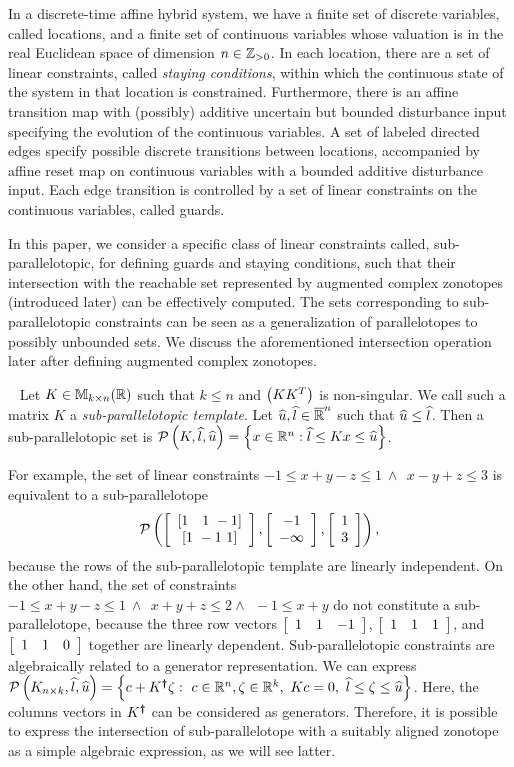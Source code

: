 
In a discrete-time affine hybrid system, we have a finite set of
discrete variables, called locations, and a finite set of continuous
variables whose valuation is in the real Euclidean space of dimension
$n\in\mathbb{Z}_{> 0}$.  In each location, there are a set of linear constraints,
called \emph{staying conditions}, within which the continuous state of
the system in that location is constrained.  Furthermore, there is an
affine transition map with (possibly) additive uncertain but bounded
disturbance input specifying the evolution of the continuous
variables. A set of labeled directed edges specify possible discrete
transitions between locations, accompanied by affine reset map on
continuous variables with a bounded additive disturbance input. Each
edge transition is controlled by a set of linear constraints on the
continuous variables, called guards.

In this paper, we consider a specific class of linear constraints
called, sub-parallelotopic, for defining guards and staying
conditions, such that their intersection with the reachable set
represented by augmented complex zonotopes (introduced later) can be
effectively computed. The sets corresponding to sub-parallelotopic
constraints can be seen as a generalization of parallelotopes to
possibly unbounded sets.  We discuss the aforementioned intersection
operation later after defining augmented complex zonotopes.
%
\begin{definition}~\label{defn:sub-parallelotope} Let
  $K\in\mathbb{M}_{k\times n}(\mathbb{R})$ such that $k\leq n$ and $\left(KK^T\right)$ is
  non-singular.  We call such a matrix $K$ a
  \emph{sub-parallelotopic template}.  Let
  $\widehat{u},\widehat{l}\in\mathbb{\overline{R}}^n$ such that $\widehat{u}\leq\widehat{l}$.  Then
  a sub-parallelotopic set is $\mathcal{P}\left(K,\widehat{l},\widehat{u}\right) = \left\{x\in\mathbb{R}^n: \widehat{l}\leq Kx \leq \widehat{u}\right\}$.
\end{definition}
%
For example, the set of linear constraints $-1\leq x+y-z\leq
1~\wedge~~ x-y+z\leq 3$ is equivalent to a sub-parallelotope
$$\mathcal{P}\left(\left[\begin{array}{c}{\left[1~~~1~-1\right]}\\{\left[1~-1~1\right]} \end{array}\right],\left[\begin{array}{c}{-1}\\{-\infty} \end{array}\right],\left[\begin{array}{c}{1}\\{3} \end{array}\right]\right),$$
because the rows of the sub-parallelotopic template are linearly
independent.  On the other hand, the set of constraints $-1\leq
x+y-z\leq 1~\wedge~~x+y+z\leq 2\wedge~~-1\leq x+y$ do not constitute a
sub-parallelotope, because the three row vectors $\left[\begin{array}{c
c c}1 & 1 & -1\end{array}\right]$, $\left[\begin{array}{c c c}1 & 1 &
1\end{array}\right]$, and $\left[\begin{array}{c c c}1 & 1 &
0\end{array}\right]$ together are linearly dependent.  Sub-parallelotopic
constraints are algebraically related to a generator representation.
We can express $\mathcal{P}\left(K_{n\times
k},\widehat{l},\widehat{u}\right)=\left\{c+K^{\bm{\dagger}}\zeta:~c\in\mathbb{R}^n,\zeta\in\mathbb{R}^k,~Kc=0,~\widehat{l}\leq \zeta\leq \widehat{u}\right\}$.
Here, the columns vectors in $K^{\bm{\dagger}}$ can be considered as generators.
Therefore, it is possible to express the intersection of
sub-parallelotope with a suitably aligned zonotope as a simple
algebraic expression, as we will see latter.

